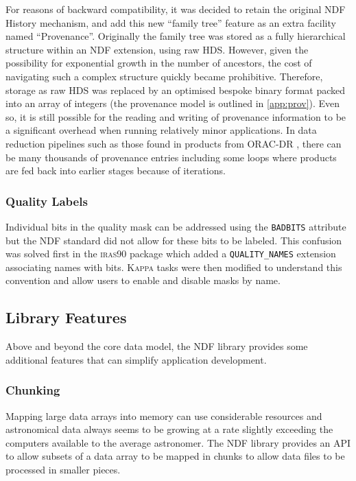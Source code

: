 \documentclass[final,authoryear,5p,times,twocolumn]{elsarticle}
\begin{document}
For reasons of backward compatibility, it was decided to retain the
original NDF History mechanism, and add this new ``family tree''
feature as an extra facility named ``Provenance''.  Originally the
family tree was stored as a fully hierarchical structure within an NDF
extension, using raw HDS. However, given the possibility for
exponential growth in the number of ancestors, the cost of navigating
such a complex structure quickly became prohibitive. Therefore,
storage as raw HDS was replaced by an optimised bespoke binary format
packed into an array of integers (the provenance model is outlined in
\ref{app:prov}). Even so, it is still possible for
the reading and writing of provenance information to be a significant
overhead when running relatively minor applications.  In data
reduction pipelines such as those found in products from ORAC-DR
\citep{2008AN....329..295C}, there can be many thousands of provenance
entries including some loops where products are fed back into earlier
stages because of iterations.

\subsubsection{Quality Labels}

Individual bits in the quality mask can be addressed using the
\texttt{BADBITS} attribute but the NDF standard did not allow for
these bits to be labeled. This confusion was solved first in the
\textsc{iras90} package which added a \texttt{QUALITY\_NAMES}
extension associating names with bits. \textsc{Kappa} tasks were then
modified to understand this convention and allow users to enable and
disable masks by name.

\subsection{Library Features}

Above and beyond the core data model, the NDF library provides some
additional features that can simplify application development.

\subsubsection{Chunking}

Mapping large data arrays into memory can use considerable resources
and astronomical data always seems to be growing at a rate slightly
exceeding the computers available to the average astronomer. The NDF
library provides an API to allow subsets of a data array to be mapped
in chunks to allow data files to be processed in smaller pieces.
\end{document}
